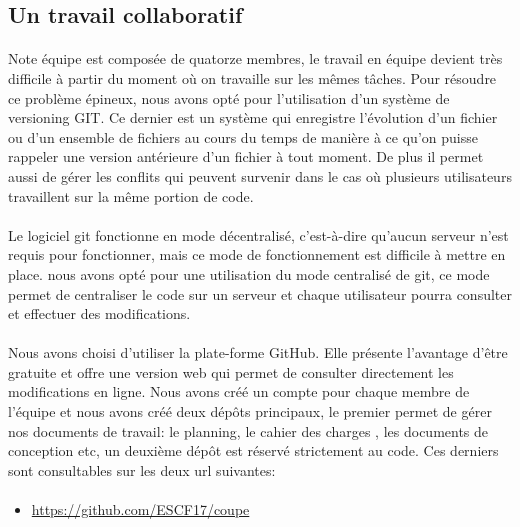 \documentclass[12pt,a4paper]{article}
\begin{document}
\newpage

\subsection{Un travail collaboratif}

\paragraph{}
Note équipe est composée de quatorze membres, le travail en équipe devient très difficile à partir du moment où on travaille
sur les mêmes tâches. Pour résoudre ce problème épineux, nous avons opté pour 
l'utilisation d'un système de versioning GIT. Ce dernier est un système qui enregistre l'évolution d'un fichier ou d'un 
ensemble de fichiers au cours du temps de manière à ce qu'on puisse rappeler une version antérieure d'un fichier à tout moment.
De plus il permet aussi de gérer les conflits qui peuvent survenir dans le cas où plusieurs utilisateurs travaillent sur 
la même portion de code.

\paragraph{}
Le logiciel git fonctionne en mode décentralisé, c'est-à-dire qu'aucun serveur n'est requis pour fonctionner, mais ce mode 
de fonctionnement est difficile à mettre en place. nous avons opté pour une utilisation du mode centralisé de git, ce mode permet
de centraliser le code sur un serveur et chaque utilisateur pourra consulter et effectuer des modifications. 

\paragraph{}
Nous avons choisi d'utiliser la plate-forme GitHub.
Elle présente l'avantage d'être gratuite et offre une version web qui permet de 
consulter directement les modifications en ligne. Nous avons créé un compte pour chaque membre de l'équipe et nous avons créé 
deux dépôts principaux, le premier permet de gérer nos documents de travail: le planning, le cahier des charges , les documents 
de conception etc, un deuxième dépôt est réservé strictement au code. Ces derniers sont consultables sur les deux url suivantes: 

\paragraph{}
\begin{itemize}
 \item \url{https://github.com/ESCF17/coupe}
\end{itemize}
\end{document}
